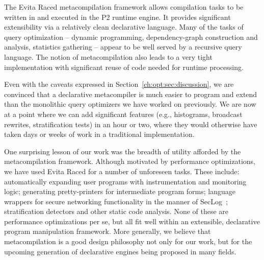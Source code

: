 The Evita Raced metacompilation framework allows \OVERLOG compilation tasks to
be written in \OVERLOG and executed in the P2 runtime engine.  It provides
significant extensibility via a relatively clean declarative language.  Many of
the tasks of query optimization -- dynamic programming, dependency-graph
construction and analysis, statistics gathering -- appear to be well served by
a recursive query language.  The notion of metacompilation also leads to a very
tight implementation with significant reuse of code needed for runtime
processing.

Even with the caveats expressed in Section~\ref{ch:opt:sec:discussion}, we are
convinced that a declarative metacompiler is much easier to program and extend
than the monolithic query optimizers we have worked on previously.  We are now
at a point where we can add significant features (e.g., histograms, broadcast
rewrites, stratification tests) in an hour or two, where they would otherwise
have taken days or weeks of work in a traditional implementation.

One surprising lesson of our work was the breadth of utility afforded by the
metacompilation framework.  Although motivated by performance optimizations, we
have used Evita Raced for a number of unforeseen tasks.  These include:
automatically expanding user programs with instrumentation and monitoring
logic; generating pretty-printers for intermediate program forms; language
wrappers for secure networking functionality in the manner of
SecLog~\cite{abadi-netdb07}; stratification detectors and other static code
analysis.  None of these are performance optimizations per se, but all fit well
within an extensible, declarative program manipulation framework.  More
generally, we believe that metacompilation is a good design philosophy not only
for our work, but for the upcoming generation of declarative engines being
proposed in many fields.

